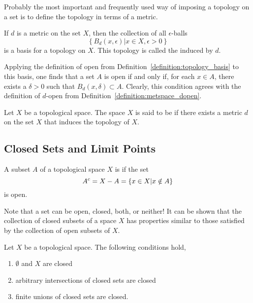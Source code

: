 Probably the most important and frequently used way of imposing a topology on a set is to define the topology in terms of a metric.
\begin{example}
If $d$ is a metric on the set $X$, then the collection of all $\epsilon$-balls
\begin{equation*}
\left\{ B_d (x, \epsilon) |  x \in X, \epsilon > 0 \right\}
\end{equation*}
is a basis for a topology on $X$.
This topology is called the  induced by $d$.

Applying the definition of open from Definition~\ref{definition:topology_basis} to this basis, one finds that a set $A$ is open if and only if, for each $x \in A$, there exists a $\delta > 0$ such that $B_d (x, \delta) \subset A$.
Clearly, this condition agrees with the definition of $d$-open from Definition~\ref{definition:metspace_dopen}.
\end{example}

\begin{definition}
Let $X$ be a topological space.
The space $X$ is said to be  if there exists a metric $d$ on the set $X$ that induces the topology of $X$.
\end{definition}


\subsection{Closed Sets and Limit Points}

\begin{definition}
A subset $A$ of a topological space $X$ is  if the set
\begin{equation*}
{A}^{c} = X - A = \{ x \in X | x \notin A \}
\end{equation*}
is open.
\end{definition}

Note that a set can be open, closed, both, or neither!
It can be shown that the collection of closed subsets of a space $X$ has properties similar to those satisfied by the collection of open subsets of $X$.

\begin{fact}
Let $X$ be a topological space.
The following conditions hold,
\begin{enumerate}
\item $\emptyset$ and $X$ are closed
\item arbitrary intersections of closed sets are closed
\item finite unions of closed sets are closed.
\end{enumerate}
\end{fact}

